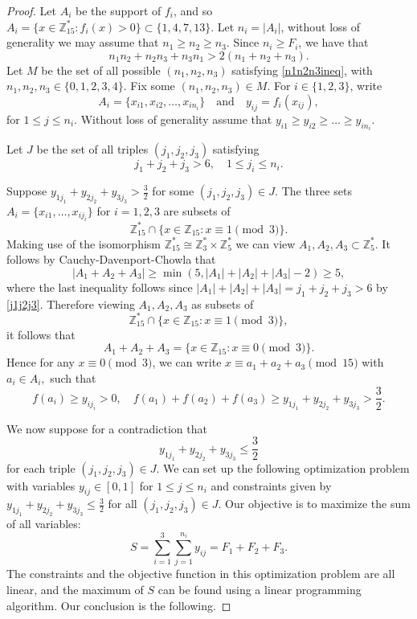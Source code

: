 \documentclass[a4paper,11pt,twoside]{amsart}
\theoremstyle{definition}
\numberwithin{equation}{section}
\newcommand\Z{\mathbb{Z}}
\begin{document}
\begin{proof}
Let $A_i$ be the support of $f_i$, and so $A_i = \{x \in \Z_{15}^* : f_i(x) > 0 \} \subset \{1,4,7,13\}.$ Let $n_i = |A_i|$, without loss of generality we may assume that $n_1 \geq n_2 \geq n_3.$ Since $n_i \geq F_i$, we have that \begin{equation} \label{n1n2n3ineq}
    n_1n_2 + n_2n_3 + n_3n_1 > 2(n_1 + n_2 + n_3).
\end{equation} Let $M$ be the set of all possible $(n_1,n_2,n_3)$ satisfying \eqref{n1n2n3ineq}, with $n_1,n_2,n_3 \in \{0,1,2,3,4\}.$ Fix some $(n_1,n_2,n_3) \in M.$ For $i \in \{1,2,3\}$, write \[A_i = \{x_{i1}, x_{i2}, \dots, x_{in_i}\} \quad \textrm{and} \quad y_{ij} = f_i(x_{ij}),
\] for $1 \leq j \leq n_i.$ Without loss of generality assume that $y_{i1} \geq y_{i2} \geq \dots \geq y_{in_i}.$ 

Let $J$ be the set of all triples $(j_1,j_2,j_3)$ satisfying \begin{equation} \label{j1j2j3}
    j_1 + j_2 + j_3 > 6, \quad 1 \leq j_i \leq n_i.
\end{equation}

Suppose $y_{1j_1} + y_{2j_2} + y_{3j_3} > \frac{3}{2}$ for some $(j_1,j_2,j_3) \in J$. The three sets $A_i = \{x_{i1},\dots, x_{ij_i}\}$ for $i = 1,2,3$ are subsets of $$\Z_{15}^* \cap \{x \in \Z_{15} : x \equiv 1 \pmod 3\}.$$ Making use of the isomorphism $\Z_{15}^* \cong \Z_3^* \times \Z_5^*$ we can view $A_1,A_2,A_3 \subset \Z_5^*$. It follows by Cauchy-Davenport-Chowla that $$|A_1+A_2+A_3| \geq \min(5,|A_1|+|A_2|+|A_3|-2) \geq 5,$$ where the last inequality follows since $|A_1|+|A_2|+|A_3| = j_1 + j_2 + j_3 > 6$ by \eqref{j1j2j3}. Therefore viewing $A_1,A_2,A_3$ as subsets of $$\Z_{15}^* \cap \{x \in \Z_{15} : x \equiv 1 \pmod 3\},$$ it follows that $$A_1 + A_2 + A_3 = \{x\in \Z_{15}: x\equiv 0 \pmod{3}\}.$$ Hence for any $x \equiv 0 \pmod{3}$, we can write $x \equiv a_1 + a_2 + a_3 \pmod{15}$ with $a_i \in A_i,$  such that $$f(a_i) \geq y_{ij_i} > 0, \quad f(a_1) + f(a_2) + f(a_3) \geq y_{1j_1} + y_{2j_2} + y_{3j_3} > \frac{3}{2}.$$

We now suppose for a contradiction that $$y_{1j_1} + y_{2j_2} + y_{3j_3} \leq \frac{3}{2}$$ for each triple $(j_1,j_2,j_3) \in J.$ We can set up the following optimization problem with variables $y_{ij} \in [0,1]$ for $1 \leq j \leq n_i$ and constraints given by  $y_{1j_1} + y_{2j_2} + y_{3j_3} \leq \frac{3}{2}$ for all $(j_1,j_2,j_3) \in J.$ Our objective is to maximize the sum of all variables: \begin{equation} \label{S opt}
    S = \sum_{i=1}^3 \sum_{j=1}^{n_i}y_{ij} = F_1 + F_2 + F_3.
\end{equation} The constraints and the objective function in this optimization problem are all linear, and the maximum of $S$ can be found using a linear programming algorithm. Our conclusion is the following. 



\end{proof}
\end{document}

